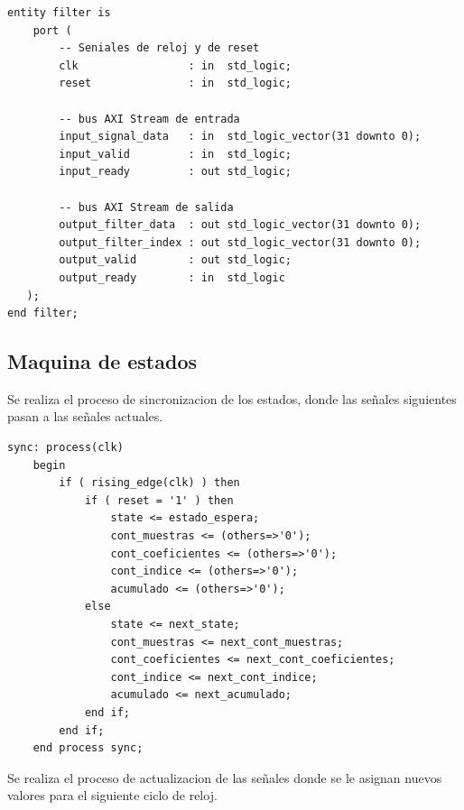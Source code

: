 \lstset{language=VHDL, breaklines=true, basicstyle=\footnotesize}
\begin{lstlisting}[frame=single]
    entity filter is
    port (
        -- Seniales de reloj y de reset
        clk                 : in  std_logic;
        reset               : in  std_logic; 
        
        -- bus AXI Stream de entrada
        input_signal_data   : in  std_logic_vector(31 downto 0);
        input_valid         : in  std_logic;
        input_ready         : out std_logic;
        
        -- bus AXI Stream de salida
        output_filter_data  : out std_logic_vector(31 downto 0);
        output_filter_index : out std_logic_vector(31 downto 0);
        output_valid        : out std_logic;
        output_ready        : in  std_logic   
   );
end filter;
\end{lstlisting}

\subsection{Maquina de estados}

Se realiza el proceso de sincronizacion de los estados, donde las señales siguientes pasan a las señales actuales.

\lstset{language=VHDL, breaklines=true, basicstyle=\footnotesize}
\begin{lstlisting}[frame=single]
    sync: process(clk)
    begin
        if ( rising_edge(clk) ) then
            if ( reset = '1' ) then
                state <= estado_espera;
                cont_muestras <= (others=>'0');
                cont_coeficientes <= (others=>'0');
                cont_indice <= (others=>'0');
                acumulado <= (others=>'0');
            else
                state <= next_state;
                cont_muestras <= next_cont_muestras;
                cont_coeficientes <= next_cont_coeficientes;
                cont_indice <= next_cont_indice;
                acumulado <= next_acumulado;                
            end if;
        end if;
    end process sync;
\end{lstlisting}

Se realiza el proceso de actualizacion de las señales donde se le asignan nuevos valores para el siguiente ciclo de reloj.


